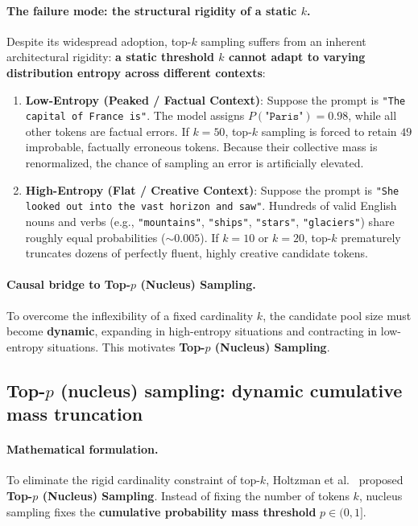 \documentclass[../../main.tex]{subfiles}
\begin{document}
\paragraph{The failure mode: the structural rigidity of a static $k$.}
Despite its widespread adoption, top-$k$ sampling suffers from an inherent architectural rigidity: \textbf{a static threshold $k$ cannot adapt to varying distribution entropy across different contexts}:
\begin{enumerate}
    \item \textbf{Low-Entropy (Peaked / Factual Context)}: Suppose the prompt is \texttt{"The capital of France is"}. The model assigns $P(\texttt{"Paris"}) = 0.98$, while all other tokens are factual errors. If $k=50$, top-$k$ sampling is forced to retain $49$ improbable, factually erroneous tokens. Because their collective mass is renormalized, the chance of sampling an error is artificially elevated.
    \item \textbf{High-Entropy (Flat / Creative Context)}: Suppose the prompt is \texttt{"She looked out into the vast horizon and saw"}. Hundreds of valid English nouns and verbs (e.g., \texttt{"mountains"}, \texttt{"ships"}, \texttt{"stars"}, \texttt{"glaciers"}) share roughly equal probabilities ($\sim 0.005$). If $k=10$ or $k=20$, top-$k$ prematurely truncates dozens of perfectly fluent, highly creative candidate tokens.
\end{enumerate}

\paragraph{Causal bridge to Top-$p$ (Nucleus) Sampling.}
To overcome the inflexibility of a fixed cardinality $k$, the candidate pool size must become \textbf{dynamic}, expanding in high-entropy situations and contracting in low-entropy situations. This motivates \textbf{Top-$p$ (Nucleus) Sampling}.

\subsection{Top-$p$ (nucleus) sampling: dynamic cumulative mass truncation}
\label{subsec:top_p_sampling}

\paragraph{Mathematical formulation.}
To eliminate the rigid cardinality constraint of top-$k$, Holtzman et al.~\cite{holtzman2020} proposed \textbf{Top-$p$ (Nucleus) Sampling}. Instead of fixing the number of tokens $k$, nucleus sampling fixes the \textbf{cumulative probability mass threshold} $p \in (0, 1]$.
\end{document}
